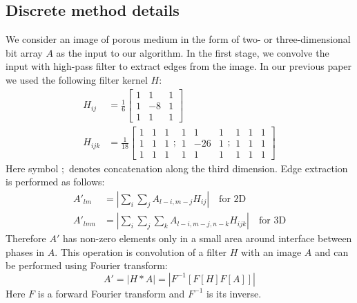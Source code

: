\documentclass[reprint,amsmath,amssymb,aps,pre,showkeys,showpacs]{revtex4-1}
\begin{document}
\subsection{Discrete method details}
We consider an image of porous medium in the form of two- or three-dimensional bit
array $A$ as the input to our algorithm. In the first stage, we convolve the
input with high-pass filter to extract edges from the image. In our previous
paper \cite{Samarin} we used the following filter kernel $H$:
\begin{equation}
  \begin{aligned}
    H_{ij} &= \frac{1}{6} \left[
      \begin{array}{ccc}
        1 & 1 & 1 \\
        1 & -8 & 1 \\
        1 & 1 & 1
      \end{array}
      \right] \\
    H_{ijk} &= \frac{1}{18} \left[
      \begin{array}{ccc}
        1 & 1 & 1 \\
        1 & 1 & 1 \\
        1 & 1 & 1
      \end{array} ;
      \begin{array}{ccc}
        1 & 1 & 1 \\
        1 & -26 & 1 \\
        1 & 1 & 1
      \end{array} ;
      \begin{array}{ccc}
        1 & 1 & 1 \\
        1 & 1 & 1 \\
        1 & 1 & 1
      \end{array}
      \right]
  \end{aligned}
  \label{eq:filter-3x3}
\end{equation}
Here symbol $;$ denotes concatenation along the third dimension. Edge extraction
is performed as follows:
\begin{align*}
  A'_{lm}  &= \left| \sum_i\sum_j A_{l-i, m-j}H_{ij} \right| \quad \text{for 2D} \\
  A'_{lmn} &= \left| \sum_i\sum_j\sum_k A_{l-i, m-j, n-k}H_{ijk} \right| \quad
  \text{for 3D}
\end{align*}
Therefore $A'$ has non-zero elements only in a small area around interface
between phases in $A$. This operation is convolution of a filter $H$ with an
image $A$ and can be performed using Fourier transform:
\begin{equation*}
  A' = |H*A| = |F^{-1}[F[H] F[A]]|
\end{equation*}
Here $F$ is a forward Fourier transform and $F^{-1}$ is its inverse.
\end{document}
